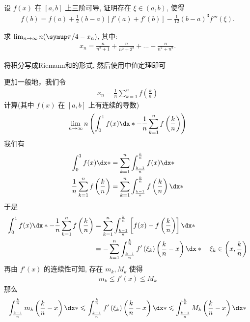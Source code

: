 \begin{exercise}[series=exer]
\begin{align*}
  \end{align*}
  \item 设 $ f(x) $ 在 $ [a, b] $ 上三阶可导, 证明存在 $ \xi \in (a, b) $, 使得
  \begin{align*}
      f(b) = f(a) + \frac{1}{2} (b - a) [f'(a) + f'(b)] - \frac{1}{12} (b - a)^{3} f'''(\xi).
  \end{align*}
  \item 求 $ \limit{n}{\infty} n \qty(\pi/4 - x_{n}) $, 其中:
  \begin{align*}
      x_{n} = \frac{n}{n^{2} + 1} + \frac{n}{n^{2} + 2^{2}} + \dots + \frac{n}{n^{2} + n^{2}}.
  \end{align*}
  \begin{hint}
    将积分写成Riemann和的形式, 然后使用中值定理即可
  \end{hint}
  \begin{answer}
    更加一般地，我们令
    \begin{align*}
      x_{n}=\frac{1}{n} \sum_{k=1}^{n} f\left(\frac{k}{n}\right)  
    \end{align*}
   计算(其中 $f(x)$ 在 $[a,b]$ 上有连续的导数)
  \begin{align*}
    \limit{n}{\infty} n\left(\int_{0}^{1} f(x) \dx*-\frac{1}{n} \sum_{k=1}^{n} f\left(\frac{k}{n}\right)\right)
  \end{align*}
  我们有
  \begin{align*}
    \int_{0}^{1} f(x) \dx* &=\sum_{k=1}^{n} \int_{\frac{k-1}{n}}^{\frac{k}{n}} f(x) \dx* \\
    \frac{1}{n} \sum_{k=1}^{n} f\left(\frac{k}{n}\right) &=\sum_{k=1}^{n} \int_{\frac{k-1}{n}}^{\frac{k}{n}} f\left(\frac{k}{n}\right) \dx*
  \end{align*}
  于是
  \begin{align*}
    \int_{0}^{1} f(x) \dx*-\frac{1}{n} \sum_{k=1}^{n} f\left(\frac{k}{n}\right) 
    &=\sum_{k=1}^{n} \int_{\frac{k-1}{n}}^{\frac{k}{n}}\left[f(x)-f\left(\frac{k}{n}\right)\right] \dx* \\
    &=-\sum_{k=1}^{n} \int_{\frac{k-1}{n}}^{\frac{k}{n}} f^{\prime}\left(\xi_{k}\right)\left(\frac{k}{n}-x\right) \dx* \quad \xi_{k} \in\left(x, \frac{k}{n}\right) 
  \end{align*}
  再由 $f'(x)$ 的连续性可知, 存在 $m_k,M_k$ 使得 
  \begin{align*}
    m_k \le f'(x) \le M_k 
  \end{align*}
  那么 
  \begin{align*}
    \int_{\frac{k-1}{n}}^{\frac{k}{n}} m_k \left(\frac{k}{n}-x\right) \dx* \le \int_{\frac{k-1}{n}}^{\frac{k}{n}} f^{\prime}\left(\xi_{k}\right)\left(\frac{k}{n}-x\right) \dx* \le  \int_{\frac{k-1}{n}}^{\frac{k}{n}} M_k \left(\frac{k}{n}-x\right) \dx*

\end{align*}
\end{answer}
\end{exercise}
